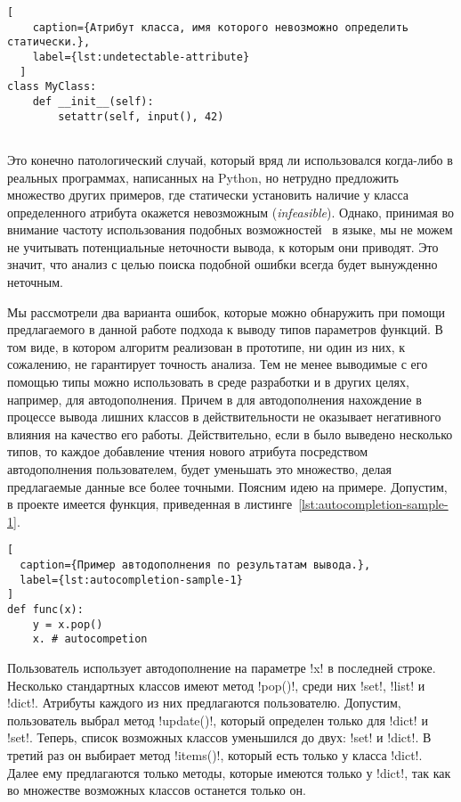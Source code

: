 \begin{description}
  \begin{lstlisting}[
    caption={Атрибут класса, имя которого невозможно определить статически.},
    label={lst:undetectable-attribute}
  ]
class MyClass:
    def __init__(self):
        setattr(self, input(), 42)
      
  \end{lstlisting} Это конечно патологический случай, который вряд ли
  использовался когда-либо в реальных программах, написанных на Python, но
  нетрудно предложить множество других примеров, где статически установить
  наличие у класса определенного атрибута окажется невозможным
  (\emph{infeasible}).  Однако, принимая во внимание частоту использования
  подобных возможностей~\cite{Holkner2009} в языке, мы не можем не учитывать
  потенциальные неточности вывода, к которым они приводят. Это значит, что
  анализ с целью поиска подобной ошибки всегда будет вынужденно неточным.

\end{description}

Мы рассмотрели два варианта ошибок, которые можно обнаружить при помощи
предлагаемого в данной работе подхода к выводу типов параметров функций.  В том
виде, в котором алгоритм реализован в прототипе, ни один из них, к сожалению, не
гарантирует точность анализа. Тем не менее выводимые с его помощью типы можно
использовать в среде разработки и в других целях, например, для автодополнения.
Причем в для автодополнения нахождение в процессе вывода лишних классов в
действительности не оказывает негативного влияния на качество его работы.
Действительно, если в было выведено несколько типов, то каждое
добавление чтения нового атрибута посредством автодополнения пользователем,
будет уменьшать это множество, делая предлагаемые данные все более точными.
Поясним идею на примере. Допустим, в проекте имеется функция, приведенная в
листинге~\ref{lst:autocompletion-sample-1}. 

\begin{lstlisting}[
  caption={Пример автодополнения по результатам вывода.},
  label={lst:autocompletion-sample-1}
]
def func(x):
    y = x.pop()
    x. # autocompetion
\end{lstlisting}

Пользователь использует автодополнение на параметре !x! в последней строке.
Несколько стандартных классов имеют метод !pop()!, среди них !set!, !list! и
!dict!. Атрибуты каждого из них предлагаются пользователю. Допустим,
пользователь выбрал метод !update()!, который определен только для !dict! и
!set!. Теперь, список возможных классов уменьшился до двух: !set! и
!dict!. В третий раз он выбирает метод !items()!, который есть только у класса
!dict!.  Далее ему предлагаются только методы, которые имеются только у !dict!,
так как во множестве возможных классов останется только он.


